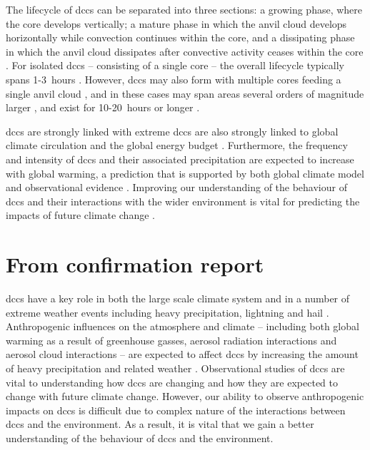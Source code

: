 The lifecycle of \acrshort{dcc}s can be separated into three sections: a growing phase, where the core develops vertically; a mature phase in which the anvil cloud develops horizontally while convection continues within the core, and a dissipating phase in which the anvil cloud dissipates after convective activity ceases within the core \citep{wall_life_2018}.
For isolated \acrshort{dcc}s -- consisting of a single core -- the overall lifecycle typically spans 1-3~hours \citep{chen_diurnal_1997}.
However, \acrshort{dcc}s may also form with multiple cores feeding a single anvil cloud \citep{roca_simple_2017}, and in these cases may span areas several orders of magnitude larger \citep{houze_mesoscale_2004}, and exist for 10-20~hours or longer \citep{chen_diurnal_1997}.

\acrshort{dcc}s are strongly linked with extreme  
\acrshort{dcc}s are also strongly linked to global climate circulation and the global energy budget \citep{houze_mesoscale_2004, fritsch_mesoscale_2001, johnson_mesoscale_2001}.
Furthermore, the frequency and intensity of \acrshort{dcc}s and their associated precipitation are expected to increase with global warming, a prediction that is supported by both global climate model \citep{allen_constraints_2002, trenberth_changing_2003, held_robust_2006, muller_energetic_2011, ogorman_energetic_2012, ogorman_precipitation_2015} and observational evidence \citep{tan_increases_2015, berg_strong_2013, aumann_increased_2018, houze_extreme_2019}.
Improving our understanding of the behaviour of \acrshort{dcc}s and their interactions with the wider environment is vital for predicting the impacts of future climate change \citep{westra_future_2014}.


\section{From confirmation report}
\acrshort{dcc}s have a key role in both the large scale climate system and in a number of extreme weather events including heavy precipitation, lightning and hail \citep[e.g.][]{westra_future_2014, houze_chapter_2014, williams_radar_1992, bruning_theory_2013, punge_hail_2016, matsudo_severe_2011}.
Anthropogenic influences on the atmosphere and climate -- including both global warming as a result of greenhouse gasses, aerosol radiation interactions and aerosol cloud interactions -- are expected to affect \acrshort{dcc}s by increasing the amount of heavy precipitation and related weather \citep[e.g.][]{allen_constraints_2002, trenberth_changing_2003, held_robust_2006, khain2005aerosol, koren_smoke_2008, rosenfeld_flood_2008, fan_microphysical_2013, fan_review_2016}.
Observational studies of \acrshort{dcc}s are vital to understanding how \acrshort{dcc}s are changing and how they are expected to change with future climate change.
However, our ability to observe anthropogenic impacts on \acrshort{dcc}s is difficult due to complex nature of the interactions between \acrshort{dcc}s and the environment.
As a result, it is vital that we gain a better understanding of the behaviour of \acrshort{dcc}s and the environment.

